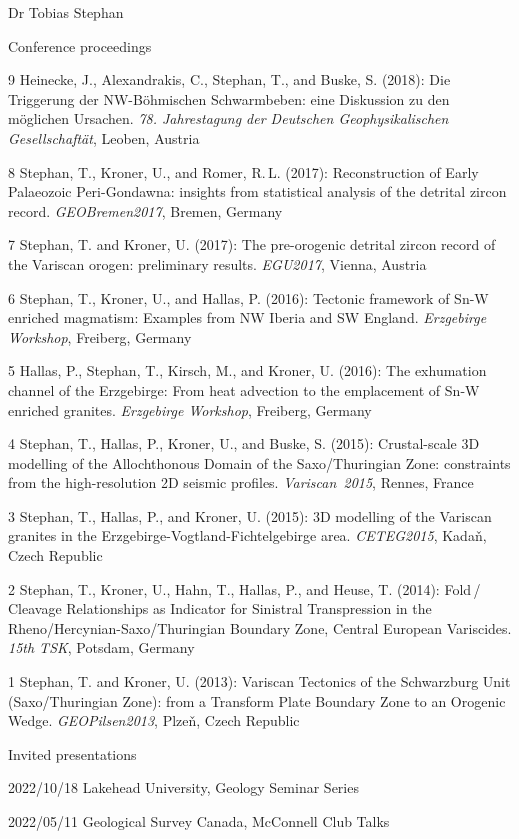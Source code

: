 \documentclass[10pt, paper=letter]{scrartcl} %
\begin{document}
\begin{cv}{Dr Tobias Stephan}
\begin{cvlist}{Conference proceedings}
    \item[9] Heinecke, J., Alexandrakis, C., Stephan, T., and Buske, S. (2018): Die Triggerung der NW-B\"ohmischen Schwarmbeben: eine Diskussion zu den m\"oglichen Ursachen. \textit{78. Jahrestagung der Deutschen Geophysikalischen Gesellschaft\"at}, Leoben, Austria
    \item[8] Stephan, T., Kroner, U., and Romer, R.\,L. (2017): Reconstruction of Early Palaeozoic Peri-Gondawna: insights from statistical analysis of the detrital zircon record. \textit{GEOBremen2017}, Bremen, Germany
    \item[7] Stephan, T. and Kroner, U. (2017): The pre-orogenic detrital zircon record of the Variscan orogen: preliminary results. \textit{EGU2017}, \mbox{Vienna}, Austria
    \item[6] Stephan, T., Kroner, U., and Hallas, P. (2016): Tectonic framework of \mbox{Sn-W} enriched magmatism: Examples from NW Iberia and SW England. \textit{Erzgebirge Workshop}, Freiberg, Germany
    \item[5] Hallas, P., Stephan, T., Kirsch, M., and Kroner, U.  (2016): The exhumation channel of the Erzgebirge: From heat advection to the emplacement of Sn-W enriched granites. \textit{Erzgebirge Workshop}, Freiberg, Germany
    \item[4] Stephan, T., Hallas, P., Kroner, U., and Buske, S. (2015): Crustal-scale 3D modelling of the Allochthonous Domain of the Saxo\-/Thuringian Zone: constraints from the high-resolution 2D seismic profiles. \mbox{\textit{Variscan 2015}}, Rennes, France 
    \item[3] Stephan, T., Hallas, P., and Kroner, U. (2015): 3D modelling of the Variscan granites in the Erzgebirge-Vogtland-Fichtelgebirge area. \mbox{\textit{CETEG2015}}, Kada\v{n}, Czech Republic
    \item[2] Stephan, T., Kroner, U., Hahn, T., Hallas, P., and Heuse, T. (2014): Fold\,/ Cleavage Relationships as Indicator for Sinistral Transpression in the Rheno\-/Hercynian\--Saxo\-/Thuringian Boundary Zone, Central European Variscides. \textit{15th TSK}, Potsdam, Germany
    \item[1] Stephan, T. and Kroner, U. (2013): Variscan Tectonics of the Schwarzburg Unit (Saxo\-/Thuringian Zone): from a Transform Plate Boundary Zone to an Orogenic Wedge. \textit{GEOPilsen2013}, Plze\v{n}, Czech Republic
    \end{cvlist}
    
\newpage    
\begin{cvlist}{Invited presentations}
  \item[2022/10/18]{Lakehead University, Geology Seminar Series}
  \item[2022/05/11]{Geological Survey Canada, McConnell Club Talks}
\end{cvlist}


\end{cv}
\end{document}
